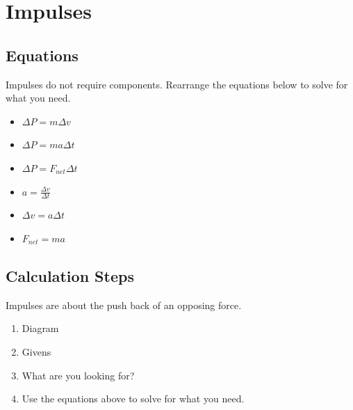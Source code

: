 \documentclass{article}
\begin{document}
\section{Impulses}
\begin{adjustwidth}{1cm}{0pt}
    \subsection*{Equations}
    \begin{flushleft}
        Impulses do not require components. Rearrange the equations below to solve for what you need.
    \end{flushleft}
    \vspace*{7pt}
    \noindent
    \begin{minipage}{0.33\textwidth}
        \begin{itemize}
            \item $\Delta P = m\Delta v$
            \item $\Delta P = ma\Delta t$
            \item $\Delta P = F_{net}\Delta t$
        \end{itemize}
    \end{minipage}
    \begin{minipage}{0.33\textwidth}
        \begin{itemize}
            \item $a = \frac{\Delta v}{\Delta t}$
            \item $\Delta v = a \Delta t$
            \item $F_{net} = ma$
        \end{itemize}
    \end{minipage}
    \subsection*{Calculation Steps}
    \begin{flushleft}
        Impulses are about the push back of an opposing force.
    \end{flushleft}
    \vspace*{5pt}
    \begin{adjustwidth}{0.5cm}{0pt}
        \begin{enumerate}
            \item Diagram
            \item Givens
            \item What are you looking for?
            \item Use the equations above to solve for what you need.
        \end{enumerate}
    \end{adjustwidth}
\end{adjustwidth}
\end{document}
